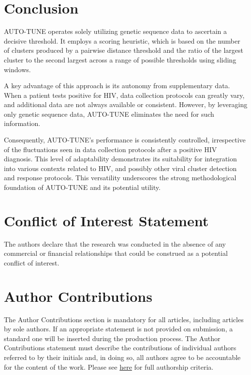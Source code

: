 \documentclass[utf8]{FrontiersinHarvard} %
\begin{document}
\section{Conclusion}

AUTO-TUNE operates solely utilizing genetic sequence data to ascertain a
decisive threshold. It employs a scoring heuristic, which is based on the
number of clusters produced by a pairwise distance threshold and the ratio of
the largest cluster to the second largest across a range of possible thresholds
using sliding windows.

A key advantage of this approach is its autonomy from supplementary data. When
a patient tests positive for HIV, data collection protocols can greatly vary,
and additional data are not always available or consistent. However, by
leveraging only genetic sequence data, AUTO-TUNE eliminates the need for such
information.

Consequently, AUTO-TUNE's performance is consistently controlled, irrespective
of the fluctuations seen in data collection protocols after a positive HIV
diagnosis. This level of adaptability demonstrates its suitability for
integration into various contexts related to HIV, and possibly other viral
cluster detection and response protocols. This versatility underscores the
strong methodological foundation of AUTO-TUNE and its potential utility.

\section*{Conflict of Interest Statement}

The authors declare that the research was conducted in the absence of any
commercial or financial relationships that could be construed as a potential
conflict of interest.

\section*{Author Contributions}

The Author Contributions section is mandatory for all articles, including
articles by sole authors. If an appropriate statement is not provided on
submission, a standard one will be inserted during the production process. The
Author Contributions statement must describe the contributions of individual
authors referred to by their initials and, in doing so, all authors agree to be
accountable for the content of the work. Please see
\href{https://www.frontiersin.org/guidelines/policies-and-publication-ethics#authorship-and-author-responsibilities}{here}
for full authorship criteria.
\end{document}
